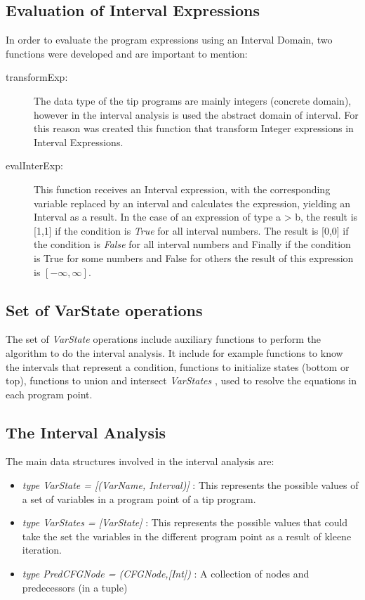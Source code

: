 \documentclass{article}
\begin{document}
\subsection{Evaluation of Interval Expressions}

In order to evaluate the program expressions using an Interval Domain, two functions were developed and are important to mention: 

\begin{description}
    \item[transformExp:] 
    The data type of the tip programs are mainly integers (concrete
domain), however in the interval analysis is used the abstract domain of interval. For
this reason was created this function that transform Integer expressions in Interval
Expressions.
    
    \item[evalInterExp:] This function receives an Interval expression, with the corresponding variable replaced by an interval and calculates the expression, yielding an Interval as a result.
In the case of an expression of type a > b, the result is [1,1] if the condition is \emph{ True } for all
interval numbers. The result is [0,0] if the condition is \emph{ False } for all interval numbers and
Finally if the condition is True for some numbers and False for others the result of this
expression is $ [-\infty, \infty] $.

\end{description}


\subsection{ Set of VarState operations }
The set of \emph{ VarState } operations include auxiliary functions to perform the algorithm
to do the interval analysis. It include for example functions to know the intervals that
represent a condition, functions to initialize states (bottom or top), functions to union
and intersect \emph{ VarStates }, used to resolve the equations in each program point.

\subsection{The Interval Analysis}
The main data structures involved in the interval analysis are:

\begin{itemize}
  \item \emph{ type VarState = [(VarName, Interval)] }: This represents the possible values of a
    set of variables in a program point of a tip program.

  \item \emph{ type VarStates = [VarState] }: This represents the possible values that could
    take the set the variables in the different program point as a result of kleene
    iteration.
  \item \emph{ type PredCFGNode = (CFGNode,[Int]) }: A collection of nodes and predecessors (in a tuple)
\end{itemize}
\end{document}
